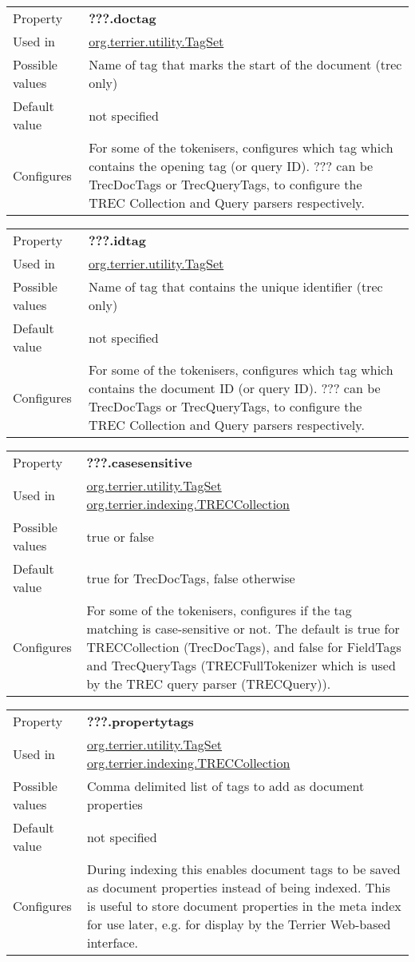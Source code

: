 \begin{longtable}[]{@{}ll@{}}
\toprule
Property & \textbf{???.doctag}\tabularnewline
Used in &
\href{javadoc/org/terrier/utility/TagSet.html}{org.terrier.utility.TagSet}\tabularnewline
Possible values & Name of tag that marks the start of the document (trec
only)\tabularnewline
Default value & not specified\tabularnewline
Configures & For some of the tokenisers, configures which tag which
contains the opening tag (or query ID). ??? can be TrecDocTags or
TrecQueryTags, to configure the TREC Collection and Query parsers
respectively.\tabularnewline
\bottomrule
\end{longtable}

\begin{longtable}[]{@{}ll@{}}
\toprule
Property & \textbf{???.idtag}\tabularnewline
Used in &
\href{javadoc/org/terrier/utility/TagSet.html}{org.terrier.utility.TagSet}\tabularnewline
Possible values & Name of tag that contains the unique identifier (trec
only)\tabularnewline
Default value & not specified\tabularnewline
Configures & For some of the tokenisers, configures which tag which
contains the document ID (or query ID). ??? can be TrecDocTags or
TrecQueryTags, to configure the TREC Collection and Query parsers
respectively.\tabularnewline
\bottomrule
\end{longtable}

\begin{longtable}[]{@{}ll@{}}
\toprule
Property & \textbf{???.casesensitive}\tabularnewline
Used in &
\href{javadoc/org/terrier/utility/TagSet.html}{org.terrier.utility.TagSet}
\href{javadoc/org/terrier/indexing/TRECCollection.html}{org.terrier.indexing.TRECCollection}\tabularnewline
Possible values & true or false\tabularnewline
Default value & true for TrecDocTags, false otherwise\tabularnewline
Configures & For some of the tokenisers, configures if the tag matching
is case-sensitive or not. The default is true for TRECCollection
(TrecDocTags), and false for FieldTags and TrecQueryTags
(TRECFullTokenizer which is used by the TREC query parser
(TRECQuery)).\tabularnewline
\bottomrule
\end{longtable}

\begin{longtable}[]{@{}ll@{}}
\toprule
Property & \textbf{???.propertytags}\tabularnewline
Used in &
\href{javadoc/org/terrier/utility/TagSet.html}{org.terrier.utility.TagSet}
\href{javadoc/org/terrier/indexing/TRECCollection.html}{org.terrier.indexing.TRECCollection}\tabularnewline
Possible values & Comma delimited list of tags to add as document
properties\tabularnewline
Default value & not specified\tabularnewline
Configures & During indexing this enables document tags to be saved as
document properties instead of being indexed. This is useful to store
document properties in the meta index for use later, e.g. for display by
the Terrier Web-based interface.\tabularnewline
\bottomrule
\end{longtable}

